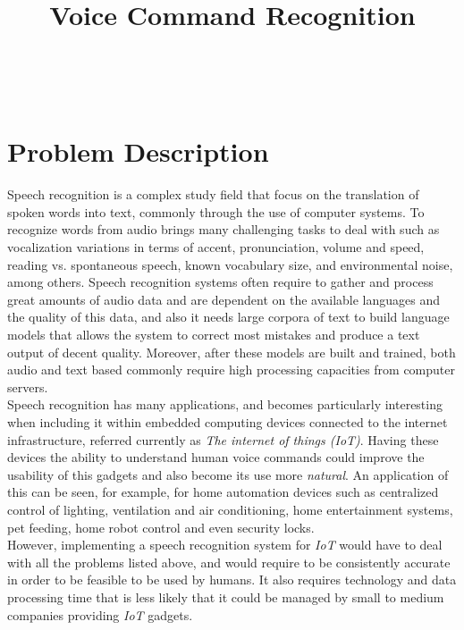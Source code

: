 \documentclass[anon]{CI}
\title[Voice Command Recognition]{Voice Command Recognition}
\author{\Name{Javier Fern\'andez} \Email{javierfdr@gmail.com}\\
 \AND
 \Name{Alejandro Hern\'andez} \Email{alejandro.ajhr@gmail.com}\\
 }
\begin{document}
\maketitle


\section{Problem Description}

Speech recognition is a complex study field that focus on the translation of spoken words into text, commonly through the use of computer systems. To recognize words from audio brings many challenging tasks to deal with such as vocalization variations in terms of accent, pronunciation, volume and speed, reading vs. spontaneous speech, known vocabulary size, and environmental noise, among others. Speech recognition systems often require to gather and process great amounts of audio data and are dependent on the available languages and the quality of this data, and also it needs large corpora of text to build language models that allows the system to correct most mistakes and produce a text output of decent quality. Moreover, after these models are built and trained, both audio and text based commonly require high processing capacities from computer servers.\\

Speech recognition has many applications, and becomes particularly interesting when including it within embedded computing devices connected to the internet infrastructure, referred currently as \emph{The internet of things (IoT)}. Having these devices the ability to understand human voice commands could improve the usability of this gadgets and also become its use more \emph{natural}. An application of this can be seen, for example, for home automation devices such as  centralized control of lighting, ventilation and air conditioning, home entertainment systems, pet feeding, home robot control and even security locks.\\
However, implementing a speech recognition system for \emph{IoT} would have to deal with all the problems listed above, and would require to be consistently accurate in order to be feasible to be used by humans. It also requires technology and data processing time that is less likely that it could be managed by small to medium companies providing \emph{IoT} gadgets.\\
\end{document}
